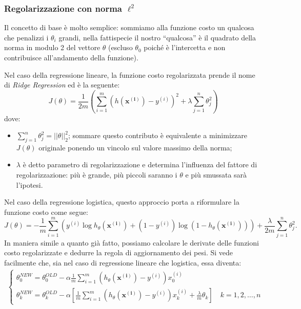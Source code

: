 \subsubsection{Regolarizzazione con norma $\ell^2$}\label{sec:regolarizzazione_l2}

Il concetto di base è molto semplice: sommiamo alla funzione costo un qualcosa che penalizzi i $\theta_i$ grandi, nella fattispecie il nostro ``qualcosa'' è il quadrato della norma in modulo 2 del vettore 
 $\theta$ (escluso $\theta_0$ poiché è l'intercetta e non contribuisce all'andamento della funzione).

Nel caso della regressione lineare, la funzione costo regolarizzata prende il nome di \emph{Ridge Regression} ed è la seguente:
\begin{equation}\label{eqJ_theta}
  J(\theta) = \frac{1}{2m} \left(\sum_{i=1}^m (h(\mathbf{x^{(i)}})-y^{(i)})^2 + \lambda \sum_{j=1}^n\theta_j^2\right)
\end{equation}
dove:
\begin{itemize}
\item $\sum_{j=1}^n\theta_j^2 = ||\theta||_2^2$; sommare questo contributo è equivalente a minimizzare $J(\theta)$ originale ponendo un vincolo sul valore massimo della norma;
\item $\lambda$ è detto parametro di regolarizzazione e determina l'influenza del fattore di regolarizzazione: più è grande, più piccoli saranno i $\theta$ e più smussata sarà l'ipotesi.
\end{itemize}
Nel caso della regressione logistica, questo approccio porta a riformulare la funzione costo come segue:
 \begin{equation*}
 J(\theta) = -\frac{1}{m}\sum_{i=1}^m \left( {y^{(i)}}\log{h_\theta(\mathbf{x^{(i)}})} + (1-y^{(i)})
 \log{(1 - h_\theta(\mathbf{x^{(i)}}))} \right) + \frac{\lambda}{2m}\sum_{j=1}^n\theta_j^2.
\end{equation*}
In maniera simile a quanto già fatto, possiamo calcolare le derivate delle funzioni costo regolarizzate e dedurre la regola di aggiornamento dei pesi. Si vede facilmente che, sia nel caso di regressione lineare che logistica, essa diventa:
\begin{gather*}\begin{cases}
\displaystyle\theta^{NEW}_0 = \theta^{OLD}_0 - \alpha \frac{1}{m} \sum_{i=1}^m \left(h_\theta(\mathbf{x^{(i)}}) - y^{(i)}\right)x_0^{(i)} \\
\displaystyle\theta^{NEW}_k = \theta^{OLD}_k - \alpha \left[ \frac{1}{m} \sum_{i=1}^m \left(h_\theta(\mathbf{x^{(i)}}) - y^{(i)}\right)x_k^{(i)}+\frac{\lambda}{m}\theta_k\right] \quad k=1,2,\dots,n
\end{cases}
\end{gather*}
